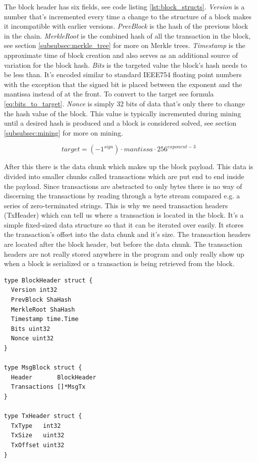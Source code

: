 \documentclass[12pt]{article}
\begin{document}
The block header has six fields, see code listing \ref{lst:block_structs}. \emph{Version} is a number that's incremented every time a change to the structure of a block makes it incompatible with earlier versions. \emph{PrevBlock} is the hash of the previous block in the chain. \emph{MerkleRoot} is the combined hash of all the transaction in the block, see section \ref{subsubsec:merkle_tree} for more on Merkle trees. \emph{Timestamp} is the approximate time of block creation and also serves as an additional source of variation for the block hash. \emph{Bits} is the targeted value the block's hash needs to be less than. It's encoded similar to standard IEEE754 floating point numbers with the exception that the signed bit is placed between the exponent and the mantissa instead of at the front. To convert to the target see formula \ref{eq:bits_to_target}. \emph{Nonce} is simply 32 bits of data that's only there to change the hash value of the block. This value is typically incremented during mining until a desired hash is produced and a block is considered solved, see section \ref{subsubsec:mining} for more on mining.

\begin{equation}\label{eq:bits_to_target}
\mathit{target} = (-1^{\mathit{sign}}) \cdot \mathit{mantissa} \cdot 256^{\mathit{exponent-3}}
\end{equation}

After this there is the data chunk which makes up the block payload. This data is divided into smaller chunks called transactions which are put end to end inside the payload. Since transactions are abstracted to only bytes there is no way of discerning the transactions by reading through a byte stream compared e.g. a series of zero-terminated strings. This is why we need transaction headers (TxHeader) which can tell us where a transaction is located in the block. It's a simple fixed-sized data structure so that it can be iterated over easily. It stores the transaction's offset into the data chunk and it's size. The transaction headers are located after the block header, but before the data chunk. The transaction headers are not really stored anywhere in the program and only really show up when a block is serialized or a transaction is being retrieved from the block.
\begin{lstlisting}[float=h!,caption={Block Structure},label=lst:block_structs]
type BlockHeader struct {
  Version int32
  PrevBlock ShaHash
  MerkleRoot ShaHash
  Timestamp time.Time
  Bits uint32
  Nonce uint32
}

type MsgBlock struct {
  Header       BlockHeader
  Transactions []*MsgTx
}

type TxHeader struct {
  TxType   int32
  TxSize   uint32
  TxOffset uint32
}
\end{lstlisting}
\end{document}

